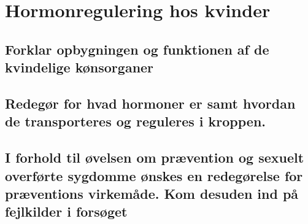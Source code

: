 \newpage
\section{Hormonregulering hos kvinder}
\subsection{Forklar opbygningen og funktionen af de kvindelige kønsorganer}
\subsection{Redegør for hvad hormoner er samt hvordan de transporteres og reguleres i kroppen.}
\subsection{I forhold til øvelsen om prævention og sexuelt overførte sygdomme ønskes en redegørelse for præventions virkemåde. Kom desuden ind på fejlkilder i forsøget}